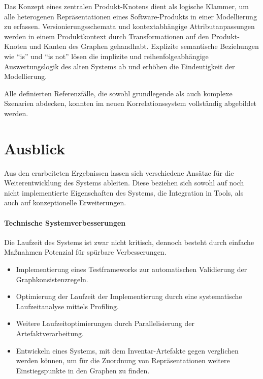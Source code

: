 Das Konzept eines zentralen Produkt-Knotens dient als logische Klammer, um alle heterogenen Repräsentationen eines Software-Produkts in einer Modellierung zu erfassen.
Versionierungsschemata und kontextabhängige Attributanpassungen werden in einem Produktkontext durch Transformationen auf den Produkt-Knoten und Kanten des Graphen gehandhabt.
Explizite semantische Beziehungen wie \enquote{is} und \enquote{is not} lösen die implizite und reihenfolgeabhängige Auswertungslogik des alten Systems ab und erhöhen die Eindeutigkeit der Modellierung.

Alle definierten Referenzfälle, die sowohl grundlegende als auch komplexe Szenarien abdecken, konnten im neuen Korrelationssystem vollständig abgebildet werden.

\section{Ausblick}\label{sec:schluss-ausblick}

Aus den erarbeiteten Ergebnissen lassen sich verschiedene Ansätze für die Weiterentwicklung des Systems ableiten.
Diese beziehen sich sowohl auf noch nicht implementierte Eigenschaften des Systems, die Integration in Tools, als auch auf konzeptionelle Erweiterungen.

\paragraph{Technische Systemverbesserungen}

Die Laufzeit des Systems ist zwar nicht kritisch, dennoch besteht durch einfache Maßnahmen Potenzial für spürbare Verbesserungen.

\begin{itemize}
    \itemsep0em
    \item Implementierung eines Testframeworks zur automatischen Validierung der Graphkonsistenzregeln.
    \item Optimierung der Laufzeit der Implementierung durch eine systematische Laufzeitanalyse mittels Profiling.
    \item Weitere Laufzeitoptimierungen durch Parallelisierung der Artefaktverarbeitung.
    \item Entwickeln eines Systems, mit dem Inventar-Artefakte gegen  verglichen werden können, um für die Zuordnung von Repräsentationen weitere Einstiegspunkte in den Graphen zu finden.
\end{itemize}

